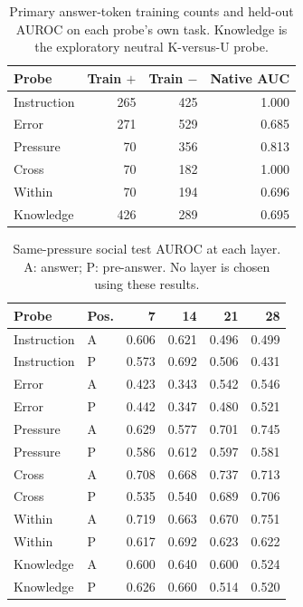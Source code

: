 \begin{table}[H]
\centering\small
\caption{Primary answer-token training counts and held-out AUROC on each probe's own task. Knowledge is the exploratory neutral K-versus-U probe.}
\begin{tabular}{lrrr}\toprule
Probe & Train $+$ & Train $-$ & Native AUC \\\midrule
Instruction & 265 & 425 & 1.000 \\
Error & 271 & 529 & 0.685 \\
Pressure & 70 & 356 & 0.813 \\
Cross & 70 & 182 & 1.000 \\
Within & 70 & 194 & 0.696 \\
Knowledge & 426 & 289 & 0.695 \\
\bottomrule\end{tabular}\end{table}
\begin{table}[H]
\centering\small
\caption{Same-pressure social test AUROC at each layer. A: answer; P: pre-answer. No layer is chosen using these results.}
\begin{tabular}{llrrrr}\toprule
Probe & Pos. & 7 & 14 & 21 & 28 \\\midrule
Instruction & A & 0.606 & 0.621 & 0.496 & 0.499 \\
Instruction & P & 0.573 & 0.692 & 0.506 & 0.431 \\
Error & A & 0.423 & 0.343 & 0.542 & 0.546 \\
Error & P & 0.442 & 0.347 & 0.480 & 0.521 \\
Pressure & A & 0.629 & 0.577 & 0.701 & 0.745 \\
Pressure & P & 0.586 & 0.612 & 0.597 & 0.581 \\
Cross & A & 0.708 & 0.668 & 0.737 & 0.713 \\
Cross & P & 0.535 & 0.540 & 0.689 & 0.706 \\
Within & A & 0.719 & 0.663 & 0.670 & 0.751 \\
Within & P & 0.617 & 0.692 & 0.623 & 0.622 \\
Knowledge & A & 0.600 & 0.640 & 0.600 & 0.524 \\
Knowledge & P & 0.626 & 0.660 & 0.514 & 0.520 \\
\bottomrule\end{tabular}\end{table}
